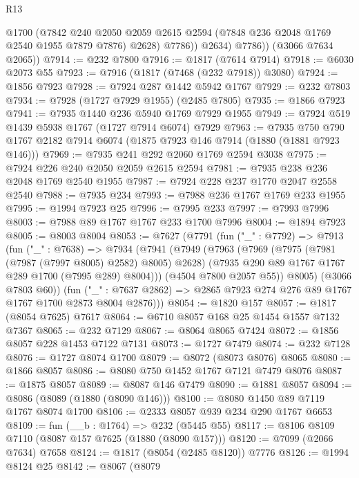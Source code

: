 \begin{lexlean}{R13}
\begin{coremodule}
                @1700
                (@7842
                  @240
                  @2050
                  @2059
                  @2615
                  @2594
                  (@7848 @236 @2048 @1769 @2540 @1955 @7879 @7876)
                  @2628)
                @7786))
            @2634)
          @7786))
      (@3066 @7634 @2065))
@7914 := @232 @7800
@7916 := @1817 (@7614 @7914)
@7918 := @6030 @2073 @55
@7923 := @7916 (@1817 (@7468 (@232 @7918)) @3080)
@7924 := @1856 @7923
@7928 := @7924 @287 @1442 @5942 @1767
@7929 := @232 @7803
@7934 := @7928 (@1727 @7929 @1955) (@2485 @7805)
@7935 := @1866 @7923
@7941 := @7935 @1440 @236 @5940 @1769 @7929 @1955
@7949 := @7924 @519 @1439 @5938 @1767 (@1727 @7914 @6074) @7929
@7963 := @7935 @750 @790 @1767 @2182 @7914 @6074 (@1875 @7923 @146 @7914 (@1880 (@1881 @7923 @146)))
@7969 := @7935 @241 @292 @2060 @1769 @2594 @3038
@7975 := @7924 @226 @240 @2050 @2059 @2615 @2594
@7981 := @7935 @238 @236 @2048 @1769 @2540 @1955
@7987 := @7924 @228 @237 @1770 @2047 @2558 @2540
@7988 := @7935 @234
@7993 := @7988 @236 @1767 @1769 @233 @1955
@7995 := @1994 @7923 @25
@7996 := @7995 @233
@7997 := @7993 @7996
@8003 := @7988 @89 @1767 @1767 @233 @1700 @7996
@8004 := @1894 @7923
@8005 := @8003 @8004
@8053 := @7627
    (@7791
      (fun ("_" : @7792) =>
      @7913
        (fun ("_" : @7638) =>
        @7934
          (@7941
            (@7949
              (@7963
                (@7969
                  (@7975 (@7981 (@7987 (@7997 @8005) @2582) @8005) @2628)
                  (@7935 @290 @89 @1767 @1767 @289 @1700 (@7995 @289) @8004)))
              (@4504 @7800 @2057 @55))
            @8005)
          (@3066 @7803 @60))
        (fun ("_" : @7637 @2862) => @2865 @7923 @274 @276 @89 @1767 @1767 @1700 @2873 @8004 @2876)))
@8054 := @1820 @157
@8057 := @1817 (@8054 @7625) @7617
@8064 := @6710 @8057 @168 @25 @1454 @1557 @7132 @7367
@8065 := @232 @7129
@8067 := @8064 @8065 @7424
@8072 := @1856 @8057 @228 @1453 @7122 @7131
@8073 := @1727 @7479
@8074 := @232 @7128
@8076 := @1727 @8074 @1700
@8079 := @8072 (@8073 @8076) @8065
@8080 := @1866 @8057
@8086 := @8080 @750 @1452 @1767 @7121 @7479 @8076
@8087 := @1875 @8057
@8089 := @8087 @146 @7479
@8090 := @1881 @8057
@8094 := @8086 (@8089 (@1880 (@8090 @146)))
@8100 := @8080 @1450 @89 @7119 @1767 @8074 @1700
@8106 := @2333 @8057 @939 @234 @290 @1767 @6653
@8109 := fun (__b : @1764) => @232 (@5445 @55)
@8117 := @8106 @8109 @7110 (@8087 @157 @7625 (@1880 (@8090 @157)))
@8120 := @7099 (@2066 @7634) @7658
@8124 := @1817 (@8054 (@2485 @8120)) @7776
@8126 := @1994 @8124 @25
@8142 := @8067
    (@8079

\end{coremodule}
\end{lexlean}
